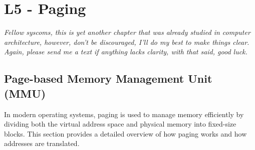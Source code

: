\chapter{L5 - Paging}
\textit{Fellow syscoms, this is yet another chapter that was already studied in computer architecture, however, don't be discouraged, I'll do my best to make things clear. Again, please send me a text if anything lacks clarity, with that said, good luck.}
\vfill
\section{Page-based Memory Management Unit (MMU)}
In modern operating systems, paging is used to manage memory efficiently by dividing both the virtual address space and physical memory into fixed-size blocks. This section provides a detailed overview of how paging works and how addresses are translated.


